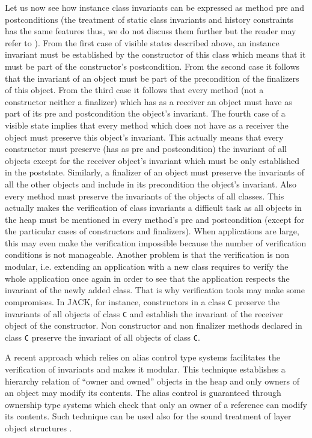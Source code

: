         Let us now see how instance class invariants   can be expressed as 
	method pre and postconditions (the treatment of static class invariants and history constraints has the same features thus, we do not discuss
       them further but the reader may refer to \cite{JMLRefMan}). From the first case of visible states described above, an instance invariant  must
	be established by the constructor of this class which means that it must be part of the constructor's postcondition. 
	From the  second case it follows that the invariant of an object must be part of the precondition of the finalizers of this object.
	From the third case it follows that every method (not a constructor neither a finalizer) which has as a receiver an object
	must have as part of its pre and postcondition the object's invariant. The fourth case of a visible state implies that every method which does not have
	as a receiver the object must preserve this object's invariant.
	This actually means that every constructor must preserve  (has as pre and postcondition)  the invariant of
	all objects except for the receiver object's invariant which must be only established
	in the poststate. Similarly, a finalizer of an object must preserve the invariants of all the other objects and include in its precondition 
	the object's invariant. Also every method must preserve
	the invariants of the objects of all classes.
	This actually makes the verification of class invariants a difficult task as all objects in 
	the heap must be mentioned in every method's pre and postcondition (except for the particular cases of constructors and finalizers).  
	When applications are large, this may even make the verification impossible because the number of verification conditions is not manageable.
	Another problem is that the verification is non modular, i.e. extending an application with a new class requires to verify the whole application once again 
	in order to see that the application respects the invariant of the newly added class.
	That is why verification tools may make some compromises.  
	In JACK, for instance, constructors in a class \texttt{C} preserve the invariants of all objects of class \texttt{C} and establish the invariant of the receiver
	object of the constructor. Non constructor and non finalizer methods declared in class \texttt{C} preserve the invariant of all objects of class \texttt{C}.   
	 
	A recent approach which relies on alias control type systems \cite{DietlMueller05,Naumann-vstteFAC} facilitates the verification of invariants and 
	makes it modular. This technique establishes a hierarchy  relation of ``owner and owned'' objects  in the heap and only owners of an object may modify its contents.
	The alias control is guaranteed through ownership type systems which check that only an owner of a reference can modify its contents. 
	Such technique  can be used also for the sound treatment of layer object structures \cite{Mueller-Poetzsch-Heffter-Leavens06}.
	
